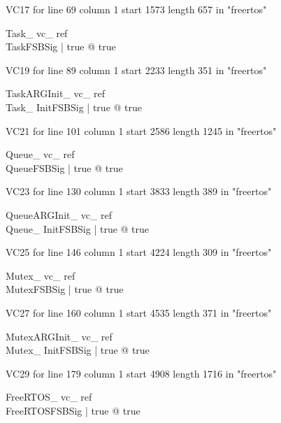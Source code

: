 \documentclass{article}
\begin{document}
VC17 for line 69 column 1 start 1573 length 657 in "freertos"
\begin{theorem}{ Task\_ vc\_ ref}\\
 \exists TaskFSBSig | true @ true \\

\end{theorem}

VC19 for line 89 column 1 start 2233 length 351 in "freertos"
\begin{theorem}{ TaskARGInit\_ vc\_ ref}\\
 \exists Task\_ InitFSBSig | true @ true \\

\end{theorem}

VC21 for line 101 column 1 start 2586 length 1245 in "freertos"
\begin{theorem}{ Queue\_ vc\_ ref}\\
 \exists QueueFSBSig | true @ true \\

\end{theorem}

VC23 for line 130 column 1 start 3833 length 389 in "freertos"
\begin{theorem}{ QueueARGInit\_ vc\_ ref}\\
 \exists Queue\_ InitFSBSig | true @ true \\

\end{theorem}

VC25 for line 146 column 1 start 4224 length 309 in "freertos"
\begin{theorem}{ Mutex\_ vc\_ ref}\\
 \exists MutexFSBSig | true @ true \\

\end{theorem}

VC27 for line 160 column 1 start 4535 length 371 in "freertos"
\begin{theorem}{ MutexARGInit\_ vc\_ ref}\\
 \exists Mutex\_ InitFSBSig | true @ true \\

\end{theorem}

VC29 for line 179 column 1 start 4908 length 1716 in "freertos"
\begin{theorem}{ FreeRTOS\_ vc\_ ref}\\
 \exists FreeRTOSFSBSig | true @ true \\

\end{theorem}
\end{document}
